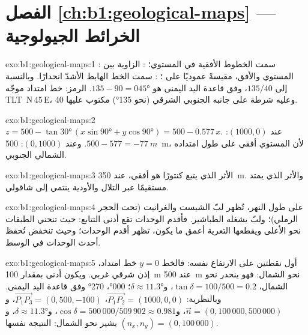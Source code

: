 \section*{الفصل \ref{ch:b1:geological-maps} --- الخرائط الجيولوجية}

\begin{solution}{exo:b1:geological-maps:1}
: سمت الخطوط الأفقية في المستوي؛ : الزاوية بين المستوي والأفق، مقيسةً عموديًا على ؛ : سمت الخط الهابط الأشدّ انحدارًا. وبالنسبة إلى $135/40$،  وفق قاعدة اليد اليمنى هو $135 - 90 = \ang{045}$. الرمز: خط امتداد موجّه
\mbox{\textdir TLT N\,45\,E}، وعليه شرطة على جانبه الجنوبي الشرقي (نحو \ang{135}) مكتوب عليها 40.
\end{solution}

\begin{solution}{exo:b1:geological-maps:2}
$z = 500 - \tan\ang{30}\,(x\sin\ang{90} + y\cos\ang{90}) = 500 - 0.577\,x$.
عند $(1000, 0)$: $500 - 577 = \qty{-77}{m}$. وعند $(0, 1000)$: \qty{500}{m}، لأن المستوي أفقي على طول امتداده الشمالي الجنوبي.
\end{solution}

\begin{solution}{exo:b1:geological-maps:3}
الأثر الذي يتبع كنتورًا هو  أفقي، عند \qty{350}{m}. والأثر الذي يمتد مستقيمًا عبر التلال والأودية ينتمي إلى  شاقولي.
\end{solution}

\begin{solution}{exo:b1:geological-maps:4}
على طول النهر، تُظهر لبّ  الشيست والغرانيت (تحت الحجر الرملي)؛ ولبّ  يشغله الطباشير. فأقدم الوحدات تقع أدنى التتابع: حيث تنحني الطبقات نحو الأعلى ويقطعها التعرية أعمق ما يكون، تظهر أقدم الوحدات؛ وحيث تنخفض تُحفظ أحدث الوحدات في الوسط.
\end{solution}

\begin{solution}{exo:b1:geological-maps:5}
أول نقطتين على الارتفاع نفسه: فالخط $y = 0$ خط امتداد، إذن  شرقي غربي. ويكون  أدنى بمقدار \qty{100}{m} عند \qty{500}{m} نحو الشمال: فهو ينحدر نحو الشمال، $\tan\delta = 100/500 = 0.2$، و$\delta \approx \ang{11.3}$؛  \ang{000}،  \ang{270} وفق قاعدة اليد اليمنى. وبالنظرية: $\overrightarrow{P_1P_2} = (1000, 0, 0)$،
$\overrightarrow{P_1P_3} = (0, 500, -100)$، و$\vec n = (0, 100\,000,
500\,000)$، و$\cos\delta = 500\,000/509\,902 \approx 0.981$، و$\delta \approx
\ang{11.3}$، و$(n_x, n_y) = (0, 100\,000)$ يشير نحو الشمال: النتيجة نفسها.
\end{solution}

